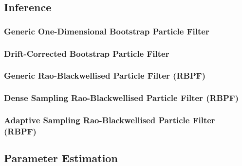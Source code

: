 \documentclass[12pt]{article}
\begin{document}
    \subsection{Inference} \label{sec:inference}
    
	    \subsubsection{Generic One-Dimensional Bootstrap Particle Filter} \label{sec:generic_bootstrap_pf}
	
		\subsubsection{Drift-Corrected Bootstrap Particle Filter} \label{sec:drift_corrected_pf}
	    
	    \subsubsection{Generic Rao-Blackwellised Particle Filter (RBPF)} \label{sec:generic_RBPF}
	    
	    \subsubsection{Dense Sampling Rao-Blackwellised Particle Filter (RBPF)} \label{sec:dense_sampling_RBPF}
	    
	    \subsubsection{Adaptive Sampling Rao-Blackwellised Particle Filter (RBPF)} \label{sec:adaptive_sampling_RBPF}
    
    
    \subsection{Parameter Estimation}
    	\label{sec:inference_param_estimation}
    	
\end{document}
